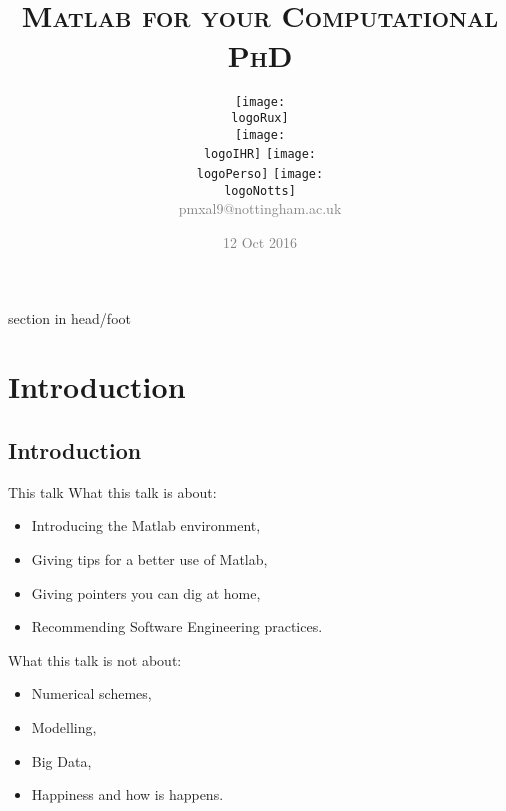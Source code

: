 \documentclass[]{beamer} %
\title[Matlab for your Computational PhD]{\small{}\\
	\small{\textsc{Matlab for your Computational PhD}\\[5mm]}
}
\author[Levity]{
	\raisebox{0.4cm}{}
	\texttt{[image: \\logoRux]}\\[12mm]
	\texttt{[image: \\logoIHR]}\hspace{0.8cm}
	\texttt{[image: \\logoPerso]}  \hspace{0.7cm}
	\texttt{[image: \\logoNotts]}\\[5mm]
	\textcolor{gray}{\small{pmxal9@nottingham.ac.uk}} \vspace{-10mm} 
}
\date{\small{\textcolor{gray}{12 Oct 2016}}}
\begin{document}
\frame[noframenumbering]{\titlepage}

\beamertemplatenavigationsymbolsempty

\frame{\tableofcontents}

 {%
  \begin{beamercolorbox}{section in head/foot}
  \insertsectionnavigationhorizontal{\textwidth}{}{}
  \end{beamercolorbox}%
}


\section[I]{Introduction}

\subsection{Introduction}
\begin{frame}{This talk}
What this talk is about:
\begin{itemize}
\item Introducing the Matlab environment,
\item Giving tips for a better use of Matlab,
\item Giving pointers you can dig at home,
\item Recommending Software Engineering practices.\\[5mm]
\end{itemize}
\pause
What this talk is not about:
\begin{itemize}
\item Numerical schemes,
\item Modelling,
\item Big Data,
\item Happiness and how is happens.
\end{itemize}
\end{frame}

\newcommand\csize[1]{\small{#1}}
\end{document}

